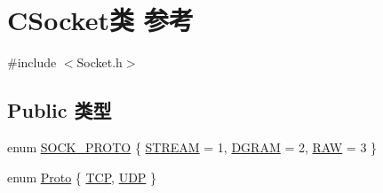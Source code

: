 \hypertarget{class_c_socket}{}\section{C\+Socket类 参考}
\label{class_c_socket}


{\ttfamily \#include $<$Socket.\+h$>$}

\subsection*{Public 类型}
\begin{DoxyCompactItemize}
\item 
enum \hyperlink{class_c_socket_a1612592be6a8334d298c6e289b7d4ac7}{S\+O\+C\+K\+\_\+\+P\+R\+O\+TO} \{ \hyperlink{class_c_socket_a1612592be6a8334d298c6e289b7d4ac7aa68b727cc96993e7b2d851efc206b816}{S\+T\+R\+E\+AM} = 1, 
\hyperlink{class_c_socket_a1612592be6a8334d298c6e289b7d4ac7ae4111634fb817bbe019d43d5466d4684}{D\+G\+R\+AM} = 2, 
\hyperlink{class_c_socket_a1612592be6a8334d298c6e289b7d4ac7abcc2f37504b085d7d179861968a81bfd}{R\+AW} = 3
 \}
\item 
enum \hyperlink{class_c_socket_a9f5168b936eacaffc83a9ba3200ec00b}{Proto} \{ \hyperlink{class_c_socket_a9f5168b936eacaffc83a9ba3200ec00ba2896b183058aba44c8b256aba6e04ede}{T\+CP}, 
\hyperlink{class_c_socket_a9f5168b936eacaffc83a9ba3200ec00baf8434cb3900ac44e8898d5e430b34e2c}{U\+DP}
 \}
\end{DoxyCompactItemize}
